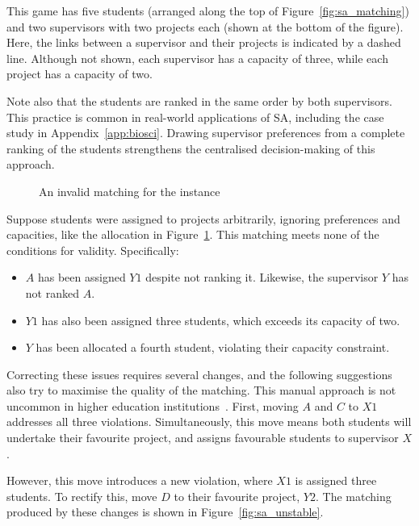 This game has five students (arranged along the top of
Figure~\ref{fig:sa_matching}) and two supervisors with two projects each (shown
at the bottom of the figure). Here, the links between a supervisor and their
projects is indicated by a dashed line. Although not shown, each supervisor has
a capacity of three, while each project has a capacity of two.

Note also that the students are ranked in the same order by both supervisors.
This practice is common in real-world applications of SA, including the case
study in Appendix~\ref{app:biosci}. Drawing supervisor preferences from a
complete ranking of the students strengthens the centralised decision-making of
this approach.

\begin{figure}[htbp]
    \centering
    \resizebox{\imgwidth}{!}{%
        
    }\caption{An invalid matching for the instance}\label{fig:sa_invalid}
\end{figure}

Suppose students were assigned to projects arbitrarily, ignoring preferences and
capacities, like the allocation in Figure~\ref{fig:sa_invalid}. This matching
meets none of the conditions for validity. Specifically:

\begin{itemize}
    \item \(A\) has been assigned \(Y1\) despite not ranking it. Likewise, the
        supervisor \(Y\) has not ranked \(A\).
    \item \(Y1\) has also been assigned three students, which exceeds its
        capacity of two.
    \item \(Y\) has been allocated a fourth student, violating their capacity
        constraint.
\end{itemize}

Correcting these issues requires several changes, and the following suggestions
also try to maximise the quality of the matching. This manual approach is not
uncommon in higher education institutions~\cite{Hussain2019}. First, moving
\(A\) and \(C\) to \(X1\) addresses all three violations. Simultaneously, this
move means both students will undertake their favourite project, and assigns
favourable students to supervisor \(X\).

However, this move introduces a new violation, where \(X1\) is assigned three
students. To rectify this, move \(D\) to their favourite project, \(Y2\). The
matching produced by these changes is shown in Figure~\ref{fig:sa_unstable}.

